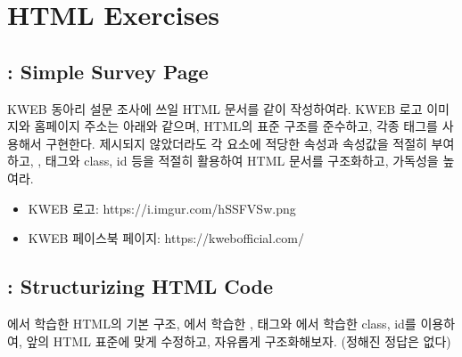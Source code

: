 \section{HTML Exercises}\label{sect:html-exercises}

\subsection*{: Simple Survey Page}

KWEB 동아리 설문 조사에 쓰일 HTML 문서를 \와 같이 작성하여라. KWEB 로고 이미지와 홈페이지 주소는 아래와 같으며, HTML의 표준 구조를 준수하고, 각종 태그를 사용해서 구현한다. 제시되지 않았더라도 각 요소에 적당한 속성과 속성값을 적절히 부여하고, ,  태그와 class, id 등을 적절히 활용하여 HTML 문서를 구조화하고, 가독성을 높여라.

\begin{itemize}
    \item KWEB 로고: https://i.imgur.com/hSSFVSw.png
    \item KWEB 페이스북 페이지: https://kwebofficial.com/
\end{itemize}

    {}

\subsection*{: Structurizing HTML Code}

에서 학습한 HTML의 기본 구조, 에서 학습한 ,  태그와 에서 학습한 class, id를 이용하여, 앞의 \를 HTML 표준에 맞게 수정하고, 자유롭게 구조화해보자. (정해진 정답은 없다)
